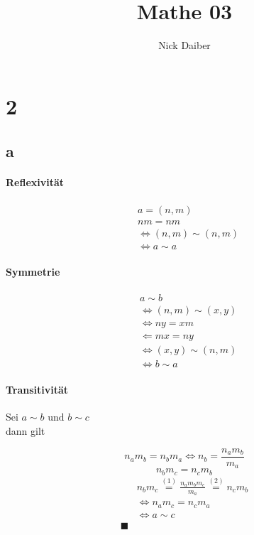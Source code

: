\documentclass{article}
\author{Nick Daiber}
\title{Mathe 03}
\begin{document}
\maketitle
\section*{2}
\subsection*{a}
\paragraph{Reflexivität}
\begin{align*}
    &a=(n,m)\\
    &nm = nm\\
    &\Leftrightarrow(n,m)\sim(n,m)\\
    &\Leftrightarrow a\sim a
\end{align*}
\paragraph{Symmetrie}
\begin{align*}
    &a\sim b\\
    &\Leftrightarrow(n,m)\sim(x,y)\\
    &\Leftrightarrow ny=xm\\
    &\Leftarrow mx=ny\\
    &\Leftrightarrow(x,y)\sim(n,m)\\
    &\Leftrightarrow b\sim a
\end{align*}
\paragraph{Transitivität\\}
Sei $a\sim b\text{ und }b\sim c$\\
dann gilt

\begin{equation}
    n_a m_b=n_b m_a\Leftrightarrow n_b=\frac{n_a m_b}{m_a}
\end{equation}
\begin{equation}
    n_b m_c=n_c m_b
\end{equation}
\begin{align*}
    &n_b m_c\overset{(1)}{=}\frac{n_a m_b m_c}{m_a}\overset{(2)}{=}n_c m_b\\
    &\Leftrightarrow n_a m_c = n_c m_a\\
    &\Leftrightarrow a\sim c\\\blacksquare
\end{align*}
\end{document}
